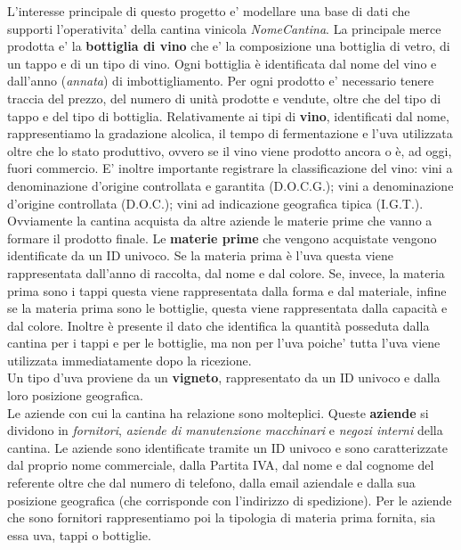 L'interesse principale di questo progetto e' modellare una base di dati che supporti l'operativita' della cantina vinicola \emph{NomeCantina}. La principale merce prodotta e' la \textbf{bottiglia di vino} che e' la composizione una bottiglia di vetro, di un tappo e di un tipo di vino. Ogni bottiglia è identificata dal nome del vino e dall'anno (\emph{annata}) di imbottigliamento. Per ogni prodotto e' necessario tenere traccia del prezzo, del numero di unità prodotte e vendute, oltre che del tipo di tappo e del tipo di bottiglia.
Relativamente ai tipi di \textbf{vino}, identificati dal nome, rappresentiamo la gradazione alcolica, il tempo di fermentazione e l'uva utilizzata oltre che lo stato produttivo, ovvero se il vino viene prodotto ancora o è, ad oggi, fuori commercio. E' inoltre importante registrare la classificazione del vino: vini a denominazione d'origine controllata e garantita (D.O.C.G.); vini a denominazione d'origine controllata (D.O.C.); vini ad indicazione geografica tipica (I.G.T.).\\ Ovviamente la cantina acquista da altre aziende le materie prime che vanno a formare il prodotto finale. Le \textbf{materie prime} che vengono acquistate vengono identificate da un ID univoco. Se la materia prima è l'uva questa viene rappresentata dall'anno di raccolta, dal nome e dal colore. Se, invece, la materia prima sono i tappi questa viene rappresentata dalla forma e dal materiale, infine se la materia prima sono le bottiglie, questa viene rappresentata dalla capacità e dal colore. Inoltre è presente il dato che identifica la quantità posseduta dalla cantina per i tappi e per le bottiglie, ma non per l'uva poiche' tutta l'uva viene utilizzata immediatamente dopo la ricezione.\\
Un tipo d'uva proviene da un \textbf{vigneto}, rappresentato da un ID univoco e dalla loro posizione geografica. \\
Le aziende con cui la cantina ha relazione sono molteplici. Queste \textbf{aziende} si dividono in \emph{fornitori}, \emph{aziende di manutenzione macchinari} e \emph{negozi interni} della cantina. Le aziende sono identificate tramite un ID univoco e sono caratterizzate dal proprio nome commerciale, dalla Partita IVA, dal nome e dal cognome del referente oltre che dal numero di telefono, dalla email aziendale e dalla sua posizione geografica (che corrisponde con l'indirizzo di spedizione). Per le aziende che sono fornitori rappresentiamo poi la tipologia di materia prima fornita, sia essa uva, tappi o bottiglie.\\

